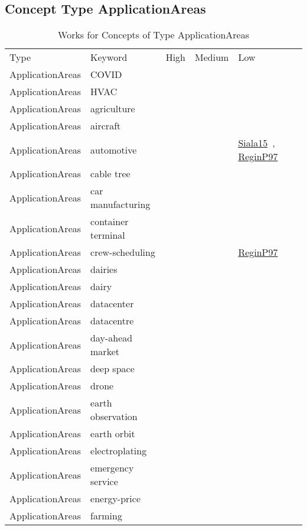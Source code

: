 \clearpage
\subsection{Concept Type ApplicationAreas}
\label{sec:ApplicationAreas}
{\scriptsize
\begin{longtable}{lp{3cm}>{\raggedright\arraybackslash}p{6cm}>{\raggedright\arraybackslash}p{6cm}>{\raggedright\arraybackslash}p{8cm}}
\rowcolor{white}\caption{Works for Concepts of Type ApplicationAreas}\\ \toprule
\rowcolor{white}Type & Keyword & High & Medium & Low\\ \midrule\endhead
\bottomrule
\endfoot
ApplicationAreas & COVID &  &  & \\
ApplicationAreas & HVAC &  &  & \\
ApplicationAreas & agriculture &  &  & \\
ApplicationAreas & aircraft &  &  & \\
ApplicationAreas & automotive &  &  & \href{cars/works/Siala15.pdf}{Siala15}~\cite{Siala15}, \href{cars/works/ReginP97.pdf}{ReginP97}~\cite{ReginP97}\\
ApplicationAreas & cable tree &  &  & \\
ApplicationAreas & car manufacturing &  &  & \\
ApplicationAreas & container terminal &  &  & \\
ApplicationAreas & crew-scheduling &  &  & \href{cars/works/ReginP97.pdf}{ReginP97}~\cite{ReginP97}\\
ApplicationAreas & dairies &  &  & \\
ApplicationAreas & dairy &  &  & \\
ApplicationAreas & datacenter &  &  & \\
ApplicationAreas & datacentre &  &  & \\
ApplicationAreas & day-ahead market &  &  & \\
ApplicationAreas & deep space &  &  & \\
ApplicationAreas & drone &  &  & \\
ApplicationAreas & earth observation &  &  & \\
ApplicationAreas & earth orbit &  &  & \\
ApplicationAreas & electroplating &  &  & \\
ApplicationAreas & emergency service &  &  & \\
ApplicationAreas & energy-price &  &  & \\
ApplicationAreas & farming &  &  & \\

\end{longtable}}
